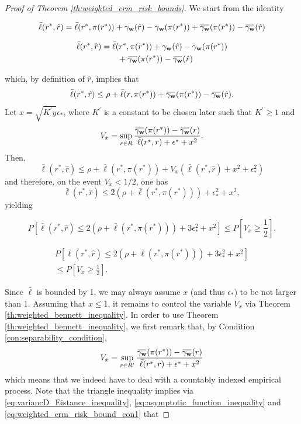 \documentclass[letterpaper]{article} %
\def\DoubleColumn{}
\def\DoubleColumnEnd{}
\def\SingleColumn{}
\def\SingleColumnEnd{}
\newcommand{\Pro}{P}
\newcommand{\overbar}[1]{\mkern 1.5mu\overline{\mkern-1.5mu#1\mkern-1.5mu}\mkern 1.5mu}
\newcommand*\cen[1]{\overbar{#1}}
\newcommand{\weight}{\mathbf{w}}
\newcommand{\relossf}{\bar{\ell}}
\newcommand{\cenprocess}[1]{\cen{\gamma_{#1}}}
\begin{document}
\begin{proof}[Proof of Theorem \ref{th:weighted_erm_risk_bounds}]
    We start from the identity
    \SingleColumn
    \[\relossf(r^*,\hat{r})=\relossf(r^*,\pi(r^*))+\gamma_\weight(\hat{r})-\gamma_\weight(\pi(r^*))+\cenprocess{\weight}(\pi(r^*))-\cenprocess{\weight}(\hat{r})\]
    \SingleColumnEnd
    \DoubleColumn
    \begin{align*}
        \relossf(r^*,\hat{r})&=\relossf(r^*,\pi(r^*))+\gamma_\weight(\hat{r})-\gamma_\weight(\pi(r^*))\\
        &\qquad+\cenprocess{\weight}(\pi(r^*))-\cenprocess{\weight}(\hat{r})
    \end{align*}
    \DoubleColumnEnd
    which, by definition of $\hat{r}$, implies that
    \[\relossf(r^*,\hat{r})\le \rho+\relossf(r,\pi(r^*))+\cenprocess{\weight}(\pi(r^*))-\cenprocess{\weight}(\hat{r}).\]
    Let $x=\sqrt{K^\prime y}\epsilon_*$, where $K^\prime$ is a constant to be chosen later such that $K^\prime\ge 1$ and
    \[V_x=\sup_{r\in R}\frac{\cenprocess{\weight}(\pi(r^*))-\cenprocess{\weight}(r)}{\relossf(r^*,r)+\epsilon^*+x^2}.\]
    Then,
    \[\relossf(r^*,\hat{r})\le \rho+\relossf(r^*,\pi(r^*))+V_x(\relossf(r^*,\hat{r})+x^2+\epsilon_*^2)\]
    and therefore, on the event $V_x<1/2$, one has
    \[\relossf(r^*,\hat{r})\le 2(\rho+\relossf(r^*,\pi(r^*)))+\epsilon_*^2+x^2,\]
    yielding
    \SingleColumn
    \begin{equation}
        \label{eq:risk_bounds_convert}
        \Pro[\relossf(r^*,\hat{r})\le 2(\rho+\relossf(r^*,\pi(r^*)))+3\epsilon_*^2+x^2]\le \Pro[V_x\ge \frac{1}{2}].
    \end{equation}
    \SingleColumnEnd
    \DoubleColumn
    \begin{equation}
        \begin{aligned}
            \label{eq:risk_bounds_convert}
            \Pro[\relossf(r^*,\hat{r})\le 2(\rho+\relossf(r^*,\pi(r^*)))+3\epsilon_*^2+x^2]\\
            \le \Pro[V_x\ge \frac{1}{2}].
        \end{aligned}
    \end{equation}
    \DoubleColumnEnd
    Since $\relossf$ is bounded by 1, we may always assume $x$ (and thus $\epsilon_*$) to be not larger than 1. Assuming that $x\le 1$, it remains to control the variable $V_x$ via Theorem \ref{th:weighted_bennett_inequality}. In order to use Theorem \ref{th:weighted_bennett_inequality}, we first remark that, by Condition \ref{con:separability_condition},
    \[V_x=\sup_{r\in R^\prime}\frac{\cenprocess{\weight}(\pi(r^*))-\cenprocess{\weight}(r)}{\relossf(r^*,r)+\epsilon^*+x^2}\]
    which means that we indeed have to deal with a countably indexed empirical process. Note that the triangle inequality implies via \eqref{eq:variancD_Eistance_inequality}, \eqref{eq:asymptotic_function_inequality} and \eqref{eq:weighted_erm_risk_bound_con1} that

\end{proof}
\end{document}

